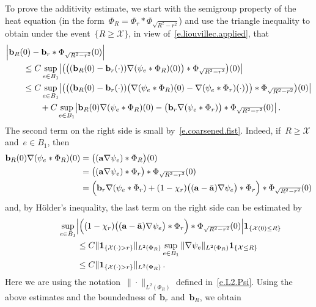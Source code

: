 \documentclass[11pt,twoside]{article} %
\numberwithin{equation}{section}
\theoremstyle{definition}
\renewcommand{\b}{\ensuremath{\mathbf{b}}}
\renewcommand{\a}{\mathbf{a}}
\newcommand{\ahom}{\bar{\a}}
\newcommand{\X}{\mathcal{X}}
\newcommand{\indc}{\boldsymbol{1}}
\newcommand{\minscale}{\chi}
\begin{document}
To prove the additivity estimate, we start with the semigroup property of the heat equation (in the form~$\Phi_R = \Phi_r \ast \Phi_{\sqrt{R^2-r^2}}$) and use the triangle inequality to obtain under the event~$\{R \geq \X\}$, in view of~\eqref{e.liouvillec.applied}, that 
\begin{align*}
\lefteqn{
\Bigl| 
 \b_R(0) - \b_r \ast \Phi_{\sqrt{R^2-r^2}} (0)
\Bigr|
} 
\qquad & 
\\ &
\leq
C \sup_{e \in B_1} \bigl|
\bigl( \bigl( ( \b_R(0) - \b_r(\cdot) ) \nabla ( \psi_e \ast \Phi_{R}) (0) \bigr)
\ast \Phi_{\sqrt{R^2-r^2}} \bigr) (0) \bigr|
\\ & 
\leq
C \sup_{e \in B_1} \bigl| \bigl( \bigl(
( \b_R (0) - \b_r (\cdot) )\bigl( \nabla ( \psi_e \ast \Phi_{R})(0) - \nabla ( \psi_e \ast \Phi_{r}) (\cdot)  \bigr) \bigr)
\ast \Phi_{\sqrt{R^2-r^2}} \bigr)(0) \bigr| 
\\ & \qquad 
+ C \sup_{e \in B_1} \bigl| \b_R(0) \nabla( \psi_e \ast \Phi_R)(0)-   \bigl( \b_r \nabla ( \psi_e \ast \Phi_{r}) \bigr) \ast\Phi_{\sqrt{R^2-r^2}}(0)
 \bigr| 
\,.
\end{align*}
The second term on the right side is small by~\eqref{e.coarsened.fist}. Indeed, if~$R \geq  \X$ and~$e \in B_1$, then
\begin{align} \notag
\b_R (0) \nabla ( \psi_e \ast \Phi_R) (0) 
&
=
\bigl( (\a\nabla \psi_e)\ast \Phi_R \bigr)(0)
\\ \notag & 
=
\bigl( 
(\a\nabla \psi_e)\ast \Phi_r 
\bigr) \ast\Phi_{\sqrt{R^2-r^2}} (0)
\\  &  
=
\Bigl( \b_r \nabla(  \psi_e \ast \Phi_r )   + (1-\minscale_{r} ) \bigl((\a - \ahom)\nabla \psi_e \bigr)\ast \Phi_r \Bigr) \ast\Phi_{\sqrt{R^2-r^2}}(0)
\label{e.semigroup.identity}
\end{align}
and, by H\"older's inequality, the last term on the right side can be estimated by
\begin{align} \notag  
\lefteqn{
\sup_{e\in B_1} \Bigl|
\Bigl( 
(1-\minscale_{r} ) \bigl((\a - \ahom)\nabla \psi_e \bigr)\ast \Phi_r \Bigr) \ast\Phi_{\sqrt{R^2-r^2}}(0)
\Bigr| \indc_{\{\X(0) \leq R \}}
} \qquad &
\\ 
\notag &
\leq C \| \indc_{\{\X(\cdot)>r\}} \|_{L^2(\Phi_{R})} 
\sup_{e\in B_1} 
\| \nabla \psi_e \|_{L^2(\Phi_{R})} \indc_{\{\X \leq R \}}
\\ \notag & 
\leq 
C \| \indc_{\{\X(\cdot)>r\}} \|_{L^2(\Phi_{R})} 
\,.
\end{align}
Here we are using the notation~$\| \cdot \|_{L^2(\Phi_R)}$ defined in~\eqref{e.L2.Psi}.
Using the above estimates and the boundedness of~$\b_r$ and~$\b_R$, we obtain
\end{document}
